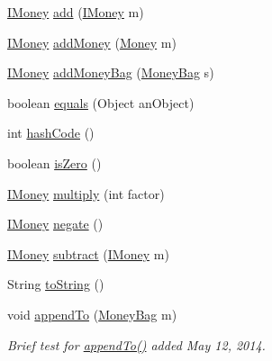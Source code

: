 \begin{DoxyCompactItemize}
\item 
\mbox{\hyperlink{interfacees_1_1deusto_1_1testing_1_1junit_1_1_i_money}{I\+Money}} \mbox{\hyperlink{classes_1_1deusto_1_1testing_1_1junit_1_1_money_bag_ab3be83ff12fa6d19b67b669194120d00}{add}} (\mbox{\hyperlink{interfacees_1_1deusto_1_1testing_1_1junit_1_1_i_money}{I\+Money}} m)
\item 
\mbox{\hyperlink{interfacees_1_1deusto_1_1testing_1_1junit_1_1_i_money}{I\+Money}} \mbox{\hyperlink{classes_1_1deusto_1_1testing_1_1junit_1_1_money_bag_a06ecedbf53ba09d34276fe177e3169bc}{add\+Money}} (\mbox{\hyperlink{classes_1_1deusto_1_1testing_1_1junit_1_1_money}{Money}} m)
\item 
\mbox{\hyperlink{interfacees_1_1deusto_1_1testing_1_1junit_1_1_i_money}{I\+Money}} \mbox{\hyperlink{classes_1_1deusto_1_1testing_1_1junit_1_1_money_bag_ab329e6a2811b83a2b1670b79be92249d}{add\+Money\+Bag}} (\mbox{\hyperlink{classes_1_1deusto_1_1testing_1_1junit_1_1_money_bag}{Money\+Bag}} s)
\item 
boolean \mbox{\hyperlink{classes_1_1deusto_1_1testing_1_1junit_1_1_money_bag_a80926d10c9619bd2ad84eabe52ca03bb}{equals}} (Object an\+Object)
\item 
int \mbox{\hyperlink{classes_1_1deusto_1_1testing_1_1junit_1_1_money_bag_ae2c0d290a37a617f0a07134bf95162eb}{hash\+Code}} ()
\item 
boolean \mbox{\hyperlink{classes_1_1deusto_1_1testing_1_1junit_1_1_money_bag_abebc5bc39c3343cb3c4e5fb291fd5893}{is\+Zero}} ()
\item 
\mbox{\hyperlink{interfacees_1_1deusto_1_1testing_1_1junit_1_1_i_money}{I\+Money}} \mbox{\hyperlink{classes_1_1deusto_1_1testing_1_1junit_1_1_money_bag_aa20ce4cc70c2ba0bc9a5ccb96635d506}{multiply}} (int factor)
\item 
\mbox{\hyperlink{interfacees_1_1deusto_1_1testing_1_1junit_1_1_i_money}{I\+Money}} \mbox{\hyperlink{classes_1_1deusto_1_1testing_1_1junit_1_1_money_bag_abf06bf97e548f95038756608fe0c8351}{negate}} ()
\item 
\mbox{\hyperlink{interfacees_1_1deusto_1_1testing_1_1junit_1_1_i_money}{I\+Money}} \mbox{\hyperlink{classes_1_1deusto_1_1testing_1_1junit_1_1_money_bag_a7f1803fe267edca895cdf752b5f46560}{subtract}} (\mbox{\hyperlink{interfacees_1_1deusto_1_1testing_1_1junit_1_1_i_money}{I\+Money}} m)
\item 
String \mbox{\hyperlink{classes_1_1deusto_1_1testing_1_1junit_1_1_money_bag_a85b49bdc3ff191abdaa1ad1a065ec5f1}{to\+String}} ()
\item 
void \mbox{\hyperlink{classes_1_1deusto_1_1testing_1_1junit_1_1_money_bag_ac8a5877b35b12939ce14543872ed18af}{append\+To}} (\mbox{\hyperlink{classes_1_1deusto_1_1testing_1_1junit_1_1_money_bag}{Money\+Bag}} m)
\begin{DoxyCompactList}\small\item\em Brief test for \mbox{\hyperlink{classes_1_1deusto_1_1testing_1_1junit_1_1_money_bag_ac8a5877b35b12939ce14543872ed18af}{append\+To()}} added May 12, 2014. \end{DoxyCompactList}\end{DoxyCompactItemize}
